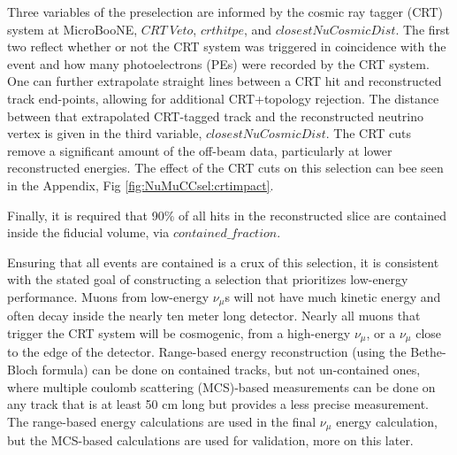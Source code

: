 \par Three variables of the preselection are informed by the cosmic ray tagger (CRT) system at MicroBooNE, $CRT\ Veto$, $crthitpe$, and $closestNuCosmicDist$. The first two reflect whether or not the CRT system was triggered in coincidence with the event and how many photoelectrons (PEs) were recorded by the CRT system. One can further extrapolate straight lines between a CRT hit and reconstructed track end-points, allowing for additional CRT+topology rejection. The distance between that extrapolated CRT-tagged track and the reconstructed neutrino vertex is given in the third variable, $closestNuCosmicDist$. The CRT cuts remove a significant amount of the off-beam data, particularly at lower reconstructed energies. The effect of the CRT cuts on this selection can bee seen in the Appendix, Fig \ref{fig:NuMuCCsel:crtimpact}.

\par Finally, it is required that 90$\%$ of all hits in the reconstructed slice are contained inside the fiducial volume, via $contained\_fraction$.

\par Ensuring that all events are contained is a crux of this selection, it is consistent with the stated goal of constructing a selection that prioritizes low-energy performance. Muons from low-energy $\nu_{\mu}$s will not have much kinetic energy and often decay inside the nearly ten meter long detector. Nearly all muons that trigger the CRT system will be cosmogenic, from a high-energy $\nu_{\mu}$, or a $\nu_{\mu}$ close to the edge of the detector. Range-based energy reconstruction (using the Bethe-Bloch formula) can be done on contained tracks, but not un-contained ones, where multiple coulomb scattering (MCS)-based measurements can be done on any track that is at least 50 cm long but provides a less precise measurement. The range-based energy calculations are used in the final $\nu_{\mu}$ energy calculation, but the MCS-based calculations are used for validation, more on this later. 

